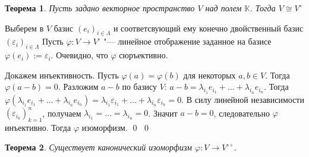 \documentclass[12pt, reqno, a4paper, oneside, notitlepage]{amsart}
\makeatletter
\theoremstyle{mytheoremstyle}
\newtheorem{theorem}{Теорема}[section]
\theoremstyle{myremarkstyle}
\numberwithin{equation}{section}
\renewenvironment{proof}[1][\proofname]{\par\indent {\bfseries #1\@addpunct{.} }}{\qed}
\makeatother
\begin{document}
\begin{theorem}
    Пусть задано векторное пространство $V$ над полем $\mathbb{K}$. Тогда $V \cong V^\circ$
\end{theorem}

\begin{proof}
    Выберем в $V$ базис $(e_i)_{i \in \Lambda}$ и соответсвующий ему конечно двойственный базис $(\varepsilon_i)_{i \in \Lambda}$
    Пусть $\varphi: V \to V^\circ$ "--- линейное отображение заданное на базисе $\varphi(e_i) := \varepsilon_i$. Очевидно, что $\varphi$ сюръективно.

    Докажем инъективность. Пусть $\varphi(a) = \varphi(b)$ для некоторых $a, b \in V$. Тогда $\varphi(a-b) = 0$. Разложим $a-b$ по базису $V$: $a-b = \lambda_{i_1}e_{i_1} + \dots + \lambda_{i_n}e_{i_n}$.
    Тогда $\varphi(\lambda_{i_1}e_{i_1} + \dots + \lambda_{i_n}e_{i_n}) = \lambda_{i_1}\varepsilon_{i_1} + \dots + \lambda_{i_n}\varepsilon_{i_n} = 0$. В силу линейной независимости $(\varepsilon_{i_k})_{k=1}^n$, получаем $\lambda_{i_1} =\dots=\lambda_{i_n} = 0$. Значит $a-b =0$, следовательно $\varphi$ инъективно. Тогда $\varphi$ изоморфизм. \qed
\end{proof}

\begin{theorem}
    Существует канонический изоморфизм $\varphi: V \to V^{\circ\circ}$.
\end{theorem}
\end{document}
